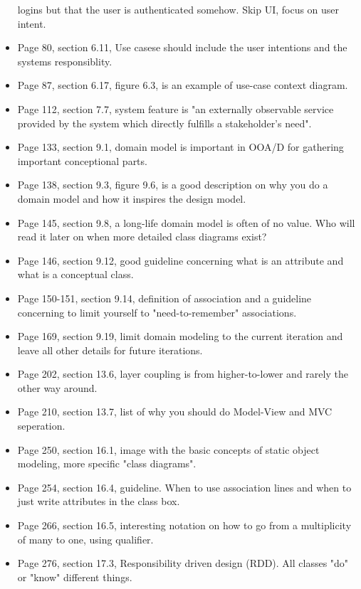\begin{itemize}
        logins but that the user is authenticated somehow. Skip UI, focus on
        user intent.
    \item Page 80, section 6.11, Use casese should include the user intentions
        and the systems responsiblity.
    \item Page 87, section 6.17, figure 6.3, is an example of use-case context
        diagram.
    \item Page 112, section 7.7, system feature is "an externally observable
        service provided by the system which directly fulfills a stakeholder's
        need".
    \item Page 133, section 9.1, domain model is important in OOA/D for
        gathering important conceptional parts.
    \item Page 138, section 9.3, figure 9.6, is a good description on why you
        do a domain model and how it inspires the design model.
    \item Page 145, section 9.8, a long-life domain model is often of no value.
        Who will read it later on when more detailed class diagrams exist?
    \item Page 146, section 9.12, good guideline concerning what is an
        attribute and what is a conceptual class.
    \item Page 150-151, section 9.14, definition of association and a guideline
        concerning to limit yourself to "need-to-remember" associations.
    \item Page 169, section 9.19, limit domain modeling to the current
        iteration and leave all other details for future iterations.
    \item Page 202, section 13.6, layer coupling is from higher-to-lower and
        rarely the other way around.
    \item Page 210, section 13.7, list of why you should do Model-View and MVC
        seperation.
    \item Page 250, section 16.1, image with the basic concepts of static
        object modeling, more specific "class diagrams".
    \item Page 254, section 16.4, guideline. When to use association lines and
        when to just write attributes in the class box.
    \item Page 266, section 16.5, interesting notation on how to go from a
        multiplicity of many to one, using qualifier.
    \item Page 276, section 17.3, Responsibility driven design (RDD). All
        classes "do" or "know" different things.

\end{itemize}
